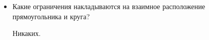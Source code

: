 \AdditionalQuestions
\begin{itemize}
    \item Какие ограничения накладываются на взаимное расположение прямоугольника и круга?\par
    \Answer Никаких.
\end{itemize}

